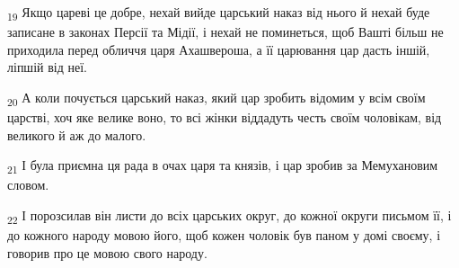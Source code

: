 \begin{tcolorbox}
\textsubscript{19} Якщо цареві це добре, нехай вийде царський наказ від нього й нехай буде записане в законах Персії та Мідії, і нехай не поминеться, щоб Вашті більш не приходила перед обличчя царя Ахашвероша, а її царювання цар дасть іншій, ліпшій від неї.
\end{tcolorbox}
\begin{tcolorbox}
\textsubscript{20} А коли почується царський наказ, який цар зробить відомим у всім своїм царстві, хоч яке велике воно, то всі жінки віддадуть честь своїм чоловікам, від великого й аж до малого.
\end{tcolorbox}
\begin{tcolorbox}
\textsubscript{21} І була приємна ця рада в очах царя та князів, і цар зробив за Мемухановим словом.
\end{tcolorbox}
\begin{tcolorbox}
\textsubscript{22} І порозсилав він листи до всіх царських округ, до кожної округи письмом її, і до кожного народу мовою його, щоб кожен чоловік був паном у домі своєму, і говорив про це мовою свого народу.
\end{tcolorbox}
